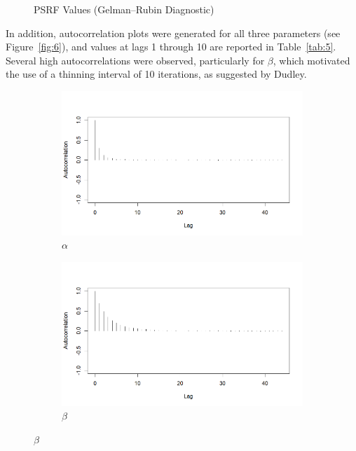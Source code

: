 \documentclass{Class/julia}
\begin{document}
\begin{figure}[!ht]
    \caption{PSRF Values (Gelman--Rubin Diagnostic)}
    \label{fig:5}
\end{figure}

In addition, autocorrelation plots were generated for all three parameters (see Figure~\ref{fig:6}), and values at lags 1 through 10 are reported in Table~\ref{tab:5}. Several high autocorrelations were observed, particularly for \( \beta \), which motivated the use of a thinning interval of 10 iterations, as suggested by Dudley.

\begin{figure}[!ht]
    \centering
    \begin{subfigure}{0.45\textwidth}
        \centering
        \includegraphics[width=\textwidth]{rytgaard1990/acf_alpha.png}
        \caption{\( \alpha \)}
    \end{subfigure}
    \hfill
    \begin{subfigure}{0.45\textwidth}
        \centering
        \includegraphics[width=\textwidth]{rytgaard1990/acf_beta.png}
        \caption{\( \beta \)}
    \end{subfigure}


\end{figure}
\end{document}

